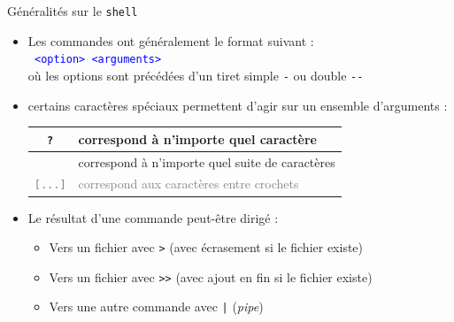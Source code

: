 \documentclass[10pt]{beamer}
\begin{document}
\begin{frame}{\Ctitle}{\stitle}
	\begin{block}{Généralités sur le {\tt shell}}
		\begin{itemize}
			\item<1-> Les commandes ont généralement le format suivant : \\
				\textcolor{blue}{\tt <nom commande> <option> <arguments>} \\
				où les options sont précédées d'un tiret  simple \textcolor{Sepia}{\tt -} ou double \textcolor{Sepia}{\tt -{}-}
			\item<2-> certains caractères spéciaux permettent d'agir sur un ensemble d'arguments : \\
				\begin{tabularx}{0.8\linewidth}{|c|X|}
					\hline
					\textcolor{Sepia}{\tt ?}    & correspond à n'importe quel caractère                      \\
					\hline
					\textcolor{Sepia}{\tt *}    & correspond à n'importe quel suite de caractères            \\
					\hline
					\textcolor{gray}{\tt [...]} & \textcolor{gray}{correspond aux caractères entre crochets} \\
					\hline
				\end{tabularx}
			\item<3-> Le résultat d'une commande peut-être dirigé :
				\begin{itemize}
					\item<4-> Vers un fichier avec \textcolor{Sepia}{\tt >} (avec écrasement si le fichier existe)
					\item<5-> Vers un fichier avec \textcolor{Sepia}{\tt >{}>} (avec ajout en fin si le fichier existe)
					\item<6-> Vers une autre commande avec \textcolor{Sepia}{\tt |} (\textit{pipe})
				\end{itemize}
		\end{itemize}
	\end{block}
\end{frame}
\end{document}
